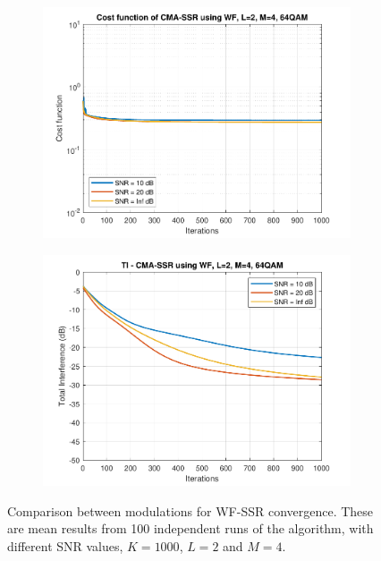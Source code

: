\begin{figure}
\begin{subfigure}[b]{0.45\textwidth}
		\includegraphics[width=\linewidth]{./figs/BF_WF_cost_64QAM_L=2_M=4_K=1000.pdf}
		\label{fig:wf_cost64}
	\end{subfigure}
	\begin{subfigure}[b]{0.45\textwidth}
		\includegraphics[width=\linewidth]{./figs/BF_WF_TI_64QAM_L=2_M=4_K=1000.pdf}
		\label{fig:wf_ti64}
	\end{subfigure}
	\caption{Comparison between modulations for WF-SSR convergence. These are mean results from 100 independent runs of the algorithm, with different SNR values, $K=1000$, $L=2$ and $M=4$.}
	\label{fig:CMA_WF_mods_L2M4}
\end{figure}

